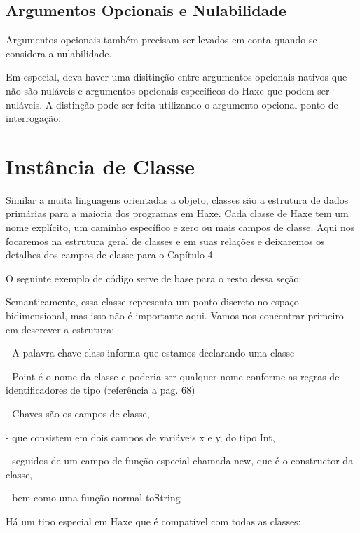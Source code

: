 \subsection{Argumentos Opcionais e Nulabilidade}

Argumentos opcionais também precisam ser levados em conta quando se considera a nulabilidade.

Em especial, deva haver uma disitinção entre argumentos opcionais nativos que não são nuláveis e argumentos opcionais específicos do Haxe que podem ser nuláveis. A distinção pode ser feita utilizando o argumento opcional ponto-de-interrogação:


\section{Instância de Classe}
Similar a muita linguagens orientadas a objeto, classes são a estrutura de dados primárias para a maioria dos programas em Haxe. Cada classe de Haxe tem um nome explícito, um caminho específico e zero ou mais campos de classe. Aqui nos focaremos na estrutura geral de classes e em suas relações e deixaremos os detalhes dos campos de classe para o Capítulo 4.

O seguinte exemplo de código serve de base para o resto dessa seção:

Semanticamente, essa classe representa um ponto discreto no espaço bidimensional, mas isso não é importante aqui. Vamos nos concentrar primeiro em descrever a estrutura:

- A palavra-chave class informa que estamos declarando uma classe

- Point é o nome da classe e poderia ser qualquer nome conforme as regras de identificadores de tipo (referência a pag. 68)

- Chaves são os campos de classe,

- que consistem em dois campos de variáveis x e y, do tipo Int,

- seguidos de um campo de função especial chamada new, que é o constructor da classe,

- bem como uma função normal toString

Há um tipo especial em Haxe que é compatível com todas as classes:

